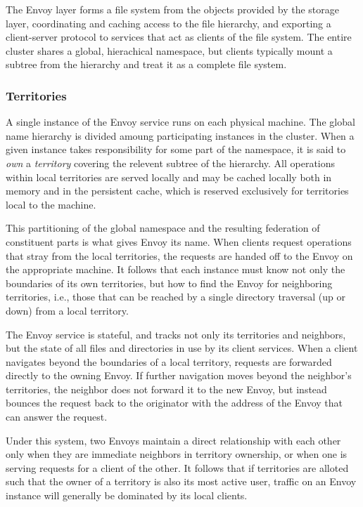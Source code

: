 The Envoy layer forms a file system from the objects provided by the storage layer, coordinating and caching access to the file hierarchy, and exporting a client-server protocol to services that act as clients of the file system. The entire cluster shares a global, hierachical namespace, but clients typically mount a subtree from the hierarchy and treat it as a complete file system.

\subsubsection{Territories}

A single instance of the Envoy service runs on each physical machine. The global name hierarchy is divided amoung participating instances in the cluster. When a given instance takes responsibility for some part of the namespace, it is said to \emph{own} a \emph{territory} covering the relevent subtree of the hierarchy. All operations within local territories are served locally and may be cached locally both in memory and in the persistent cache, which is reserved exclusively for territories local to the machine.

This partitioning of the global namespace and the resulting federation of constituent parts is what gives Envoy its name. When clients request operations that stray from the local territories, the requests are handed off to the Envoy on the appropriate machine. It follows that each instance must know not only the boundaries of its own territories, but how to find the Envoy for neighboring territories, i.e., those that can be reached by a single directory traversal (up or down) from a local territory.

The Envoy service is stateful, and tracks not only its territories and neighbors, but the state of all files and directories in use by its client services. When a client navigates beyond the boundaries of a local territory, requests are forwarded directly to the owning Envoy. If further navigation moves beyond the neighbor's territories, the neighbor does not forward it to the new Envoy, but instead bounces the request back to the originator with the address of the Envoy that can answer the request.

Under this system, two Envoys maintain a direct relationship with each other only when they are immediate neighbors in territory ownership, or when one is serving requests for a client of the other. It follows that if territories are alloted such that the owner of a territory is also its most active user, traffic on an Envoy instance will generally be dominated by its local clients.

